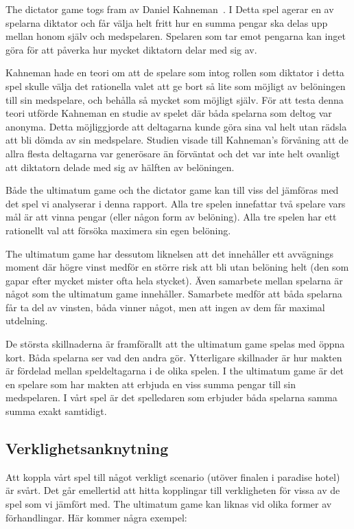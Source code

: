 The dictator game togs fram av Daniel Kahneman~\cite{Kahneman:1986}. I Detta spel agerar en av spelarna diktator och får välja helt fritt hur en summa pengar ska delas upp mellan honom själv och medspelaren. Spelaren som tar emot pengarna kan inget göra för att påverka hur mycket diktatorn delar med sig av. 

Kahneman hade en teori om att de spelare som intog rollen som diktator i detta spel skulle välja det rationella valet att ge bort så lite som möjligt av belöningen till sin medspelare, och behålla så mycket som möjligt själv. För att testa denna teori utförde Kahneman en studie av spelet där båda  spelarna som deltog var anonyma. Detta möjliggjorde att deltagarna kunde göra sina val helt utan rädsla att bli dömda av sin medspelare. Studien visade till Kahneman’s förvåning att de allra flesta deltagarna var generösare än förväntat och det var inte helt ovanligt att diktatorn delade med sig av hälften av belöningen.

Både the ultimatum game och the dictator game kan till viss del jämföras med det spel vi analyserar i denna rapport. Alla tre spelen innefattar två spelare vars mål är att vinna pengar (eller någon form av belöning). Alla tre spelen har ett rationellt val att försöka maximera sin egen belöning.

The ultimatum game har dessutom liknelsen att det innehåller ett avvägnings moment där högre vinst medför en större risk att bli utan belöning helt (den som gapar efter mycket mister ofta hela stycket). Även samarbete mellan spelarna är något som the ultimatum game innehåller. Samarbete medför att båda spelarna får ta del av vinsten, båda vinner något, men att ingen av dem får maximal utdelning.

De största skillnaderna är framförallt att the ultimatum game spelas med öppna kort. Båda spelarna ser vad den andra gör. Ytterligare skillnader är hur makten är fördelad mellan speldeltagarna i de olika spelen. I the ultimatum game är det en spelare som har makten att erbjuda en viss summa pengar till sin medspelaren. I vårt spel är det spelledaren som erbjuder båda spelarna samma summa exakt samtidigt.

\subsection{Verklighetsanknytning}
Att koppla vårt spel till något verkligt scenario (utöver finalen i paradise hotel) är svårt. Det går emellertid att hitta kopplingar till verkligheten för vissa av de spel som vi jämfört med. The ultimatum game kan liknas vid olika former av förhandlingar. Här kommer några exempel:

